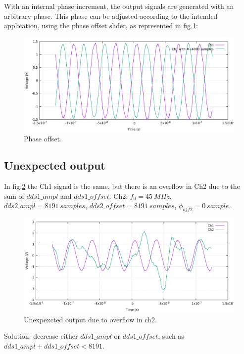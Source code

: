 \documentclass[12pt,oneside]{article}
\begin{document}
With an internal phase increment, the output signals are generated with an arbitrary phase. This phase can be adjusted according to the intended application, using the phase offset slider, as represented in fig.\ref{fig:doubleDDSphase}:

\begin{figure}[h!tb]
	\begin{center}
		\includegraphics[width=14cm]{scope/doubleDDSokPhi.pdf}
		\caption{Phase offset.}
		\label{fig:doubleDDSphase}
	\end{center}
\end{figure}

\vspace{-1cm}
\subsection{Unexpected output}\label{subsect:doubleDDSpasOk}

In fig.\ref{fig:doubleDDSpasOk} the Ch1 signal is the same, but there is an overflow in Ch2 due to the sum of $dds1\_ampl$ and $dds1\_offset$. \newline
Ch2: $f_0=45~MHz$, $dds2\_ampl=8191~samples$, $dds2\_offset=8191~samples$, \newline $\phi_{off2}=0~sample$.

\begin{figure}[!h!tb]
	\begin{center}
		\includegraphics[width=14cm]{scope/doubleDDSpasOk.pdf}
		\caption{Unexpexcted output due to overflow in ch2.}
		\label{fig:doubleDDSpasOk}
	\end{center}
\end{figure}
Solution: decrease either $dds1\_ampl$ or $dds1\_offset$, such as ${dds1\_ampl + dds1\_offset < 8191}$.
\end{document}
